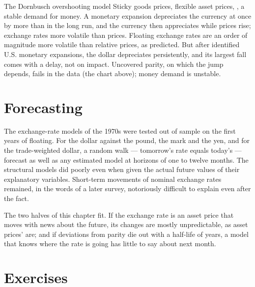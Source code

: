 \begin{model}{The Dornbusch overshooting model}
\assumes Sticky goods prices, flexible asset prices, ,
a stable demand for money.
\predicts A monetary expansion depreciates the currency at once by more than in the
long run, and the currency then appreciates while prices rise; exchange rates more
volatile than prices.
\tested Floating exchange rates are an order of magnitude more volatile than
relative prices, as predicted. %
But after
identified U.S. monetary expansions, the dollar depreciates persistently, and
its largest fall comes with a delay, not on impact. %
\breaks Uncovered parity, on which the jump depends, fails in the data (the chart
above); money demand is unstable.
\end{model}

\section{Forecasting}\label{sec:b3:exchange-rates:forecasting}

\begin{record}
The exchange-rate models of the 1970s were tested out of sample on the first years
of floating. For the dollar against the pound, the mark and the yen, and for the
trade-weighted dollar, a random walk --- tomorrow's rate equals today's ---
forecast as well as any estimated model at horizons of one to twelve months. The
structural models did poorly even when given the actual future values of their
explanatory variables. %
Short-term movements of nominal exchange rates remained, in the words of a later
survey, notoriously difficult to explain even after the fact.
\end{record}

The two halves of this chapter fit. If the exchange rate is an asset price that
moves with news about the future, its changes are mostly unpredictable, as asset
prices' are; and if deviations from parity die out with a half-life of years, a
model that knows where the rate is going has little to say about next month.

\section{Exercises}\label{sec:b3:exchange-rates:exercises}

